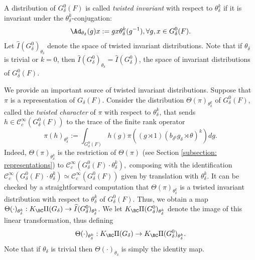 \documentclass[11pt,letterpaper]{amsart}
\numberwithin{equation}{section}
\begin{document}
\begin{definition}\label{definition: twisted invariant distributions}
A distribution of $G^0_{\delta}(F)$ is called {\it twisted invariant} with respect to $\theta_{\delta}^k$ if it is invariant under the $\theta_{\delta}^k$-conjugation: 
\[ \Ad_{\theta_{\delta}}(g)x:= gx\theta_{\delta}^k(g^{-1}), \forall g, x \in G^0_{\delta}(F).  \]
Let $\widehat{I}(G^0_{\delta})_{\theta_{\delta}}$ denote the space of twisted invariant distributions.
Note that if $\theta_{\delta}$ is trivial or $k=0$, then $\widehat{I}(G^0_{\delta})_{\theta_{\delta}}= \widehat{I}(G^0_{\delta})$, the space of invariant distributions of $G^0_{\delta}(F)$. 
\end{definition}


We provide an important source of twisted invariant distributions. Suppose that $\pi$ is a representation of $G_{\delta}(F)$. 
Consider the distribution $\Theta(\pi)_{\theta_{\delta}^k}$ of $G^0_\delta(F)$, called the {\it twisted character} of $\pi$  with respect to $\theta_{\delta}^k$, that sends $h \in \mathcal{C}_{c}^{\infty}(G^0_{\delta}(F))$ to the trace of the finite rank operator 
\[ 
\pi(h)_{\theta_{\delta}^k}:= \int_{ G^0_\delta(F)} h(g) \pi( (g \rtimes 1)  (b_{\delta^0}g_{\delta} \rtimes  \theta)^k) dg.  
\]
Indeed, $\Theta(\pi)_{\theta_{\delta}^k}$ is the restriction of $\Theta(\pi)$ (see Section \ref{subsection: representations}) to $\mathcal{C}_{c}^{\infty}(G^0_{\delta}(F)\cdot \theta_{\delta}^k),$ composing with the identification $\mathcal{C}_{c}^{\infty}(G^0_{\delta}(F)\cdot \theta_{\delta}^k)\simeq \mathcal{C}_{c}^{\infty}(G^0_{\delta}(F))$ given by translation with $\theta_{\delta}^k$.
It can be checked by a straightforward computation that $\Theta(\pi)_{\theta_{\delta}^k}$ is a twisted invariant distribution with respect to $\theta_{\delta}^k$ of $G^0_\delta(F)$. Thus, we obtain a map 
$\Theta (\cdot)_{\theta_{\delta}^k}: K_{\BC} \Pi (G_\delta) \to \widehat{I}(G^0_\delta)_{\theta_{\delta}^k}$.
We let $K_{\BC}\Pi(G^0_{\delta})_{\theta_{\delta}^k}$ denote the image of this linear transformation, thus defining
\begin{equation}\label{equation: Theta theta}
\Theta (\cdot)_{\theta_{\delta}^k}: K_{\BC} \Pi (G_\delta) \to K_{\BC}\Pi(G^0_{\delta})_{\theta_{\delta}^k}.
\end{equation}
Note that if $\theta_{\delta}$ is trivial then  $\Theta(\cdot)_{\theta_{\delta}}$ is simply the identity map. 
\end{document}
